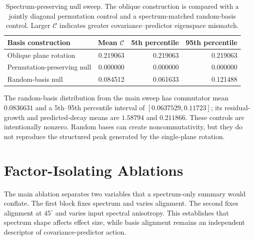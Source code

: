 \documentclass{article}
\begin{document}
\begin{table}[H]
\centering
\caption{Spectrum-preserving null sweep. The oblique construction is compared with a jointly diagonal permutation control and a spectrum-matched random-basis control. Larger $\mathcal C$ indicates greater covariance--predictor eigenspace mismatch.}
\label{tab:supp-null}
\begin{tabular*}{\linewidth}{@{\extracolsep{\fill}}lrrr@{}}
\toprule
Basis construction & Mean $\mathcal C$ & 5th percentile & 95th percentile \\
\midrule
Oblique plane rotation & 0.219063 & 0.219063 & 0.219063 \\
Permutation-preserving null & 0.000000 & 0.000000 & 0.000000 \\
Random-basis null & 0.084512 & 0.061633 & 0.121488 \\
\bottomrule
\end{tabular*}
\end{table}

The random-basis distribution from the main sweep has commutator mean
$0.0836631$ and a 5th--95th percentile interval of $[0.0637529,0.11723]$;
its residual-growth and predicted-decay means are $1.58794$ and $0.211866$.
These controls are intentionally nonzero. Random bases can create
noncommutativity, but they do not reproduce the structured peak generated by
the single-plane rotation.

\section{Factor-Isolating Ablations}
\label{sec:supp-ablation}

The main ablation separates two variables that a spectrum-only summary would conflate. The first block fixes spectrum and varies alignment. The second fixes alignment at $45^\circ$ and varies input spectral anisotropy. This establishes that spectrum shape affects effect size, while basis alignment remains an independent descriptor of covariance-predictor action.
\end{document}
